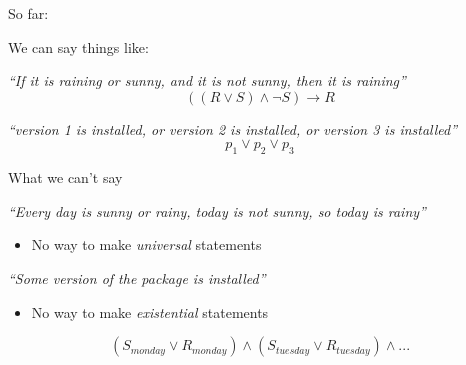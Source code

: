 \documentclass[xetex,aspectratio=169,14pt,hyperref={pdfpagelabels=true,pdflang={en-GB}}]{beamer}
\begin{document}
\frame{\titlepage}


\begin{frame}
  So far:
  \begin{center}
  \end{center}

  \bigskip

  We can say things like:

  \medskip

  \quad  \emph{``If it is raining or sunny, and it is not sunny, then it is raining''}
  \begin{displaymath}
    ((R \lor S) \land \lnot S) \to R
  \end{displaymath}

  \bigskip

  \emph{``version 1 is installed, or version 2 is installed, or version 3 is installed''}
  \begin{displaymath}
    p_1 \lor p_2 \lor p_3
  \end{displaymath}
\end{frame}

\begin{frame}
  {What we can't say}

  \emph{``Every day is sunny or rainy, today is not sunny, so today is rainy''}
  \begin{itemize}
  \item No way to make \emph{universal} statements
  \end{itemize}

  \bigskip

  \emph{``Some version of the package is installed''} \\
  \begin{itemize}
  \item No way to make \emph{existential} statements
  \end{itemize}

  \pause
  \bigskip

  \begin{displaymath}
    (S_{\mathit{monday}} \lor R_{\mathit{monday}}) \land (S_{\mathit{tuesday}} \lor R_{\mathit{tuesday}}) \land ...
  \end{displaymath}
\end{frame}
\end{document}
